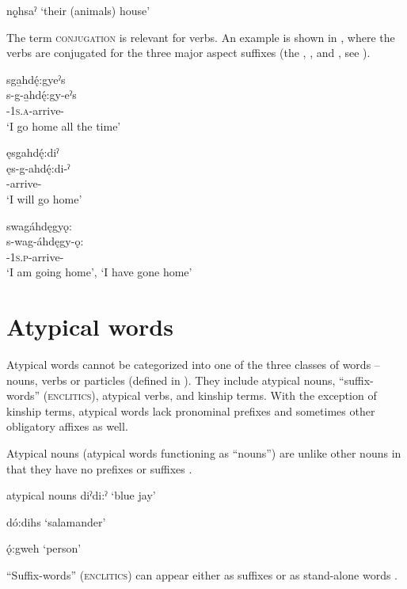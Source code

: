 \ex {}nǫ̱hsaˀ ‘their (animals) house’

\z
\z

The term \textsc{conjugation} is relevant for verbs. An example is shown in , where the verbs are conjugated for the three major aspect suffixes (the {\habitual}, {\punctual}, and {\stative}, see ). 

\ea\label{ex:prefsufstemidex5}
\ea sga̱hdę́:gyeˀs\\
\gll s-g-a̱hdę́:gy-eˀs\\
 {\repetitive}-\textsc{1s.a}-arrive-{\habitual}\\
\glt `I go home all the time'

\ex ęsgahdę́:diˀ\\
\gll ęs-g-ahdę́:di-ˀ\\
 {\futurerepetitive}-arrive-{\punctual}\\
\glt `I will go home'

\ex swagáhdęgyǫ: \\
\gll s-wag-áhdęgy-ǫ:\\
 {\repetitive}-\textsc{1s.p}-arrive-{\stative}\\
\glt ‘I am going home’, `I have gone home'
\z
\z


\section{Atypical words} \label{Atypical words}
Atypical words cannot be categorized into one of the three classes of  words -- nouns, verbs or particles (defined in ). They include atypical nouns, “suffix-words” (\textsc{enclitics}), atypical verbs, and kinship terms. With the exception of kinship terms, atypical words lack pronominal prefixes and sometimes other obligatory affixes as well.

Atypical nouns (atypical words functioning as “nouns”) are unlike other nouns in that they have no prefixes or suffixes .

\ea\label{ex:non.canonical1} atypical nouns
\ea diˀdi:ˀ ‘blue jay’

\ex dó:dihs ‘salamander’

\ex ǫ́:gweh ‘person’
\z
\z

“Suffix-words” (\textsc{enclitics}) can appear either as suffixes  or as stand-alone words .


